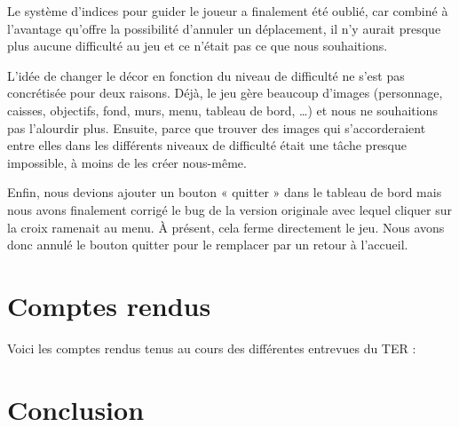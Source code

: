 \documentclass[english,11pt]{report}
\begin{document}
\vspace{0.2cm}
Le système d’indices pour guider le joueur a finalement été oublié, car combiné à l’avantage qu’offre la possibilité d’annuler un déplacement, il n’y aurait presque plus aucune difficulté au jeu et ce n’était pas ce que nous souhaitions.\par
\vspace{0.2cm}
L’idée de changer le décor en fonction du niveau de difficulté ne s’est pas concrétisée pour deux raisons. Déjà, le jeu gère beaucoup d’images (personnage, caisses, objectifs, fond, murs, menu, tableau de bord, …) et nous ne souhaitions pas l’alourdir plus. Ensuite, parce que trouver des images qui s’accorderaient entre elles dans les différents niveaux de difficulté était une tâche presque impossible, à moins de les créer nous-même.\par
\vspace{0.2cm}
Enfin, nous devions ajouter un bouton « quitter » dans le tableau de bord mais nous avons finalement corrigé le bug de la version originale avec lequel cliquer sur la croix ramenait au menu. À présent, cela ferme directement le jeu. Nous avons donc annulé le bouton quitter pour le remplacer par un retour à l’accueil.\par
\vspace{0.2cm}

\appendix
\chapter{Comptes rendus}
Voici les comptes rendus tenus au cours des différentes entrevues du TER :
\vspace{0.2cm}








\chapter*{Conclusion}
\end{document}

